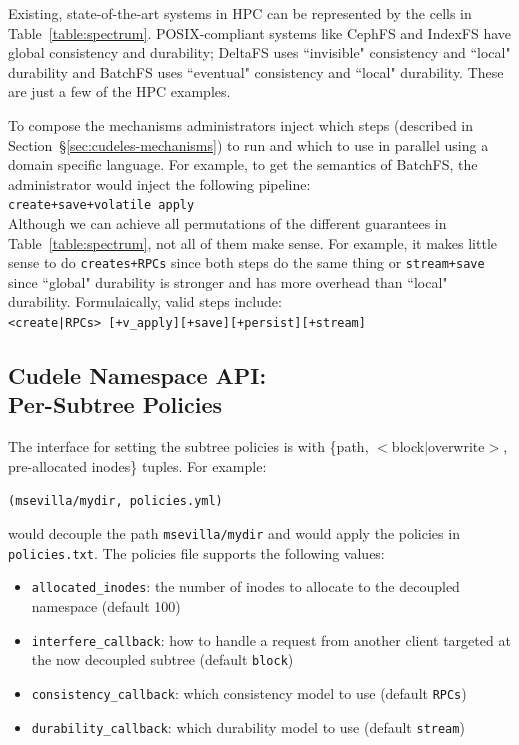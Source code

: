 Existing, state-of-the-art systems in HPC can be represented by the cells in
Table~\ref{table:spectrum}.  POSIX-compliant systems like CephFS and IndexFS
have global consistency and durability; DeltaFS uses ``invisible" consistency
and ``local" durability and BatchFS uses ``eventual" consistency and ``local"
durability. These are just a few of the HPC examples.  

To compose the mechanisms administrators inject which steps (described in
Section~\S\ref{sec:cudeles-mechanisms}) to run and which to use in parallel
using a domain specific language. For example, to get the semantics of BatchFS,
the administrator would inject the following pipeline:\\

\noindent \texttt{create+save+volatile apply}\\

Although we can achieve all permutations of the different guarantees in
Table~\ref{table:spectrum}, not all of them make sense. For example, it
makes little sense to do \texttt{creates+RPCs} since both steps do the same
thing or \texttt{stream+save} since ``global" durability is stronger and has
more overhead than ``local" durability.  Formulaically, valid steps
include:\\

\noindent \texttt{<create|RPCs> [+v\_apply][+save][+persist][+stream]}

\subsection{Cudele Namespace API:\\Per-Subtree Policies}
\label{sec:cudele-namespace-api-per-subtree-policies}

The interface for setting the subtree policies is with \{path,
\(<\)block\(|\)overwrite\(>\), pre-allocated inodes\} tuples. For example:

\texttt{(msevilla/mydir, policies.yml)}

would decouple the path \texttt{msevilla/mydir} and would apply the policies in
\texttt{policies.txt}. The policies file supports the following values:

\begin{itemize}

  \item \texttt{allocated\_inodes}: the number of inodes to allocate to the
  decoupled namespace (default 100)

  \item \texttt{interfere\_callback}: how to handle a request from another
  client targeted at the now decoupled subtree (default \texttt{block})

  \item \texttt{consistency\_callback}: which consistency model to use (default
  \texttt{RPCs})

  \item \texttt{durability\_callback}: which durability model to use (default
  \texttt{stream})

\end{itemize}

